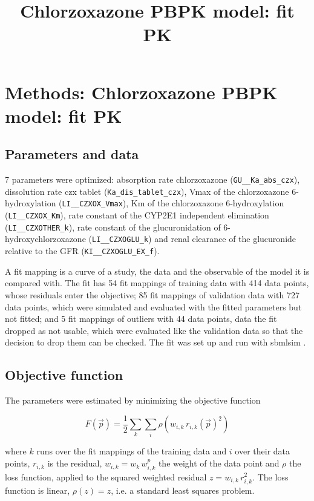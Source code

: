 \documentclass{article}
\title{Chlorzoxazone PBPK model: fit PK}
\date{}
\begin{document}
\maketitle

\section{Methods: Chlorzoxazone PBPK model: fit PK}

\subsection{Parameters and data}

7 parameters were optimized: absorption rate chlorzoxazone (\texttt{GU\_\_Ka\_abs\_czx}), dissolution rate czx tablet (\texttt{Ka\_dis\_tablet\_czx}), Vmax of the chlorzoxazone 6-hydroxylation (\texttt{LI\_\_CZXOX\_Vmax}), Km of the chlorzoxazone 6-hydroxylation (\texttt{LI\_\_CZXOX\_Km}), rate constant of the CYP2E1 independent elimination (\texttt{LI\_\_CZXOTHER\_k}), rate constant of the glucuronidation of 6-hydroxychlorzoxazone (\texttt{LI\_\_CZXOGLU\_k}) and renal clearance of the glucuronide relative to the GFR (\texttt{KI\_\_CZXOGLU\_EX\_f}).

A fit mapping is a curve of a study, the data and the observable of the model it is compared with. The fit has 54 fit mappings of training data with 414 data points, whose residuals enter the objective; 85 fit mappings of validation data with 727 data points, which were simulated and evaluated with the fitted parameters but not fitted; and 5 fit mappings of outliers with 44 data points, data the fit dropped as not usable, which were evaluated like the validation data so that the decision to drop them can be checked. The fit was set up and run with sbmlsim \cite{Koenig2026_sbmlsim}.

\subsection{Objective function}

The parameters were estimated by minimizing the objective function

\begin{equation}
F(\vec{p}) = \frac{1}{2} \sum_{k} \sum_{i} \rho\left(w_{i,k}\, r_{i,k}(\vec{p})^2\right)
\end{equation}

where $k$ runs over the fit mappings of the training data and $i$ over their data points, $r_{i,k}$ is the residual, $w_{i,k} = w_k\, w^{p}_{i,k}$ the weight of the data point and $\rho$ the loss function, applied to the squared weighted residual $z = w_{i,k}\, r_{i,k}^2$. The loss function is linear, $\rho(z) = z$, i.e. a standard least squares problem.
\end{document}
